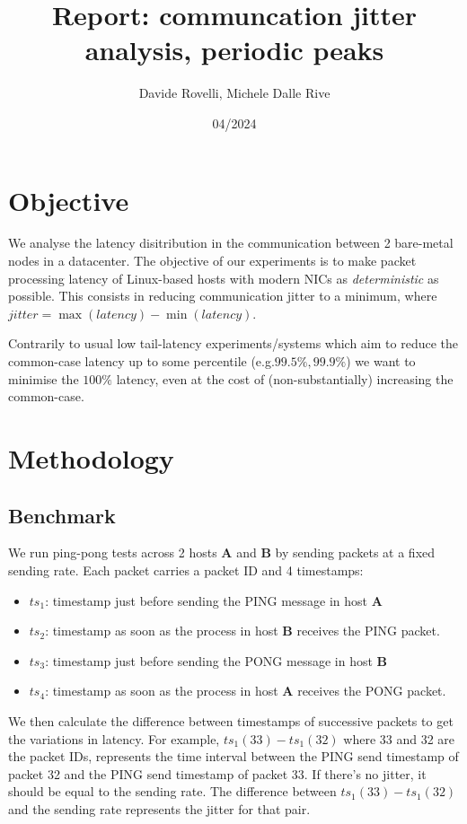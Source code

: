 \documentclass{article}
\begin{document}
\date{04/2024}

\title{\Large \bf Report: communcation jitter analysis, periodic peaks}

\author{Davide Rovelli, Michele Dalle Rive}
\maketitle

\section*{Objective}
We analyse the latency disitribution in the communication between 2 bare-metal 
nodes in a datacenter. The objective of our experiments is to make packet 
processing latency of Linux-based hosts with modern NICs as \textit{deterministic}
as possible. This consists in reducing communication jitter to a minimum, where
$jitter = \max(latency) - \min(latency)$.

Contrarily to usual low tail-latency experiments/systems which aim to reduce the
common-case latency up to some percentile (e.g.$99.5\%, 99.9\%$) we want to minimise 
the $100\%$ latency, even at the cost of (non-substantially) increasing the 
common-case. 

\section*{Methodology}

\subsection*{Benchmark}
We run ping-pong tests across 2 hosts \textbf{A} and \textbf{B} by sending packets
at a fixed sending rate. Each packet carries a packet ID and 4 timestamps:

\begin{itemize}
  \itemsep=-0.8mm
  \item $ts_1$: timestamp just before sending the PING message in host \textbf{A}
  \item $ts_2$: timestamp as soon as the process in host \textbf{B} receives the
  PING packet.
  \item $ts_3$: timestamp just before sending the PONG message in host \textbf{B}
  \item $ts_4$: timestamp as soon as the process in host \textbf{A} receives the
  PONG packet.
\end{itemize}

We then calculate the difference between timestamps of successive packets
to get the variations in latency. For example, $ts_1(33) - ts_1(32)$ where 33 and
32 are the packet IDs, represents the time interval between the PING send timestamp
of packet 32 and the PING send timestamp of packet 33. If there's no jitter,
it should be equal to the sending rate. The difference between $ts_1(33) - ts_1(32)$
and the sending rate represents the jitter for that pair. 
\end{document}
